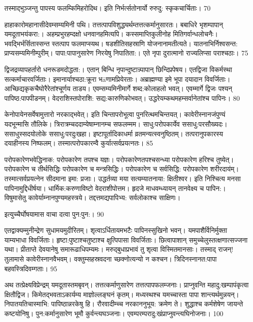 तस्माद्भुञ्जन्तु पापस्य फलम्किमिहरोदिथ।
 इति निर्भर्त्सतोनार्यो रुरुदु: स्कृकचार्चिताः।
 70

  हाहाकारोमहानासीदेवम्सम्यमिनी पथि।
 तत्तत्पापविशुद्ध्यर्थम्तत्तत्कर्मानुसारतः।
 बबाधिरे भृशम्पापान् यमदूताभयंकरा:।
 अहम्प्रभुरहम्दक्षो धनवानहमित्यपि।
 कस्समाप्तिकुलीनोह मितिगर्वान्धलोचनैः।
 भवद्भिर्भर्सितास्सन्त स्तत्पाप फलमाप्स्यथ।
 षडशीतिसहस्राणि योजनानामतीत्यते।
 यातनाभिर्निश्वसन्त: प्राप्यसम्यमिनीम्पुरीम्।
 पापा:पापानुसारेण निरयेषु निपातिता:।
 एते नृपा दुरात्मानो राज्यलिप्सा पराश्चठाः।
 75

  द्विजद्रव्यापहर्तारो धनरूडमदोद्धता:।
 एतान् बिन्धि नृपान्दुष्टान्न्पापान् छिन्दिप्रपेषय।
 एतद्विजा विकर्मस्था सत्कर्माचारवर्जिताः।
 इमानार्याश्चठा:क्रूरा भāणामप्रियेरताः।
 अब्राह्मण्या इमे भूपा दयादान विवर्जिताः।
 आच्छिद्यकृकचैघोरैरेतांश्चूर्णय ताडय।
 एवम्सम्यमिनीमार्गे शब्द:कोलाहलो भवत्।
 एवम्मार्गे द्विजः पश्यन् पापिष्ठ:पापपीडनम्।
 वेदराशिस्तपोराशि: सद्य:कारुणिकोभवत्।
 उद्धरेयम्कथमहम्सर्वानेतांश्च पापिनः।
 80

 

केनोपायेनसर्वेषामुत्तारो नरकाद्भवेत्।
 इति चिन्तापरोभूत्वा पुनरित्थमचिन्तयत्।
 कावेरीस्नानजंपुण्यं यदभून्मासि तौलिके।
 त्रिरात्रम्चददाम्येषाम्नानम्च सफलम्मम।
 साधु:परोपकार्येव ससाधु:परसौख्यदः।
 ससाधुस्सदयोलोके ससाधु:परदुःखहा।
 इष्टापूर्तादिकाधर्मा व्रतमन्यत्स्वनुष्ठितम्।
 तत्परानुपकारस्य दयाहीनस्य निष्फलम्।
 तस्मात्परोपकारम्वै कुर्यात्सर्वप्रयत्नतः।
 85

  परोपकारेणभवेद्धिनाक: परोपकारेण तपश्च यज्ञः।
 परोपकारेणतपश्चसन्ध्या परोपकारेण हरिश्च तुष्येत्।
 परोपकारेण च तीर्थसिद्धिः
परोपकारेण च मन्त्रसिद्धिः।
 परोपकारेण च सर्वसिद्धि:
परोपकारेण शरीरदाय॑म्।
 तस्मात्सर्वप्रयत्नेन सीदमाना इमा: प्रजाः।
 उद्धर्तव्या मया सत्यम्यातनाया: क्षितीश्वर।
 इति निश्चित्य मनसा पापिनामुद्दिधीर्षया।
 धार्मिक:करुणाविष्टो वेदराशीपोत्तम।
 हृदजे माधवम्ध्यायन् तानवेक्ष्य च पापिन:।
 विषुमासेतु कावेर्याम्नानपुण्यमहस्त्रये।
 तद्दत्तमद्यपापिभ्य: सर्वलोकाश्च साक्षिणः।
 

इत्युच्चैर्घोषयामास वाचा दत्वा पुन:पुन:।
 90

  एतद्वाक्यम्मुनीन्द्रेण सुधामयमुदीरितम्।
 शृत्वाऽर्धितायमभटैः पापिनस्सुखिनो भवन्।
 यमपाशैर्विनिर्मुक्ता याम्यभाधा विवर्जिताः।
 हृष्टा:पुष्टाश्चतुष्टाश्च क्षुत्पिपासा विवर्जिताः।
 छित्वापाशान् समुच्चेलुस्तत्क्षणात्सज्जना यथा।
 प्रीताप्ते देवयानेषु समारूढाधिपम्यमः।
 मरुद्बुधाप्रभावं तु शृत्वा विस्मितमानसाः।
 तस्माद् राजन्! तुलामासे कावेरीस्नानवैभवम्।
 वक्तुम्सहस्रवदना च्छक्नोत्यन्यो न कश्चन।
 त्रिदिनस्नानत:पापा बहवस्त्रिदिवम्गताः।
 95

  अथ तत्प्रेक्ष्यविप्रेन्द्रम् यमदूतास्तमबृवन्।
 तत्तत्कर्माणुसारेण तत्तत्पापफलम्जनाः।
 प्राप्नुवन्ति महादु:खम्पापंकृत्वा क्षितौद्विज।
 किमेतद्भवताऽकार्यम्य माज्ञोल्लङ्घनं कृतम्।
 मध्यस्थश्च यमच्चास्ता पापा शान्त्यर्थमुन्नयन्।
 निपातयतिचास्माभि: पापिष्ठान्नरकेषु हि।
 रौरवादीम्च्च नरकाननुभूय: क्रमेण ते।
 शुद्धाश्च कर्मशेषेण जायन्ते कष्टयोनिषु।
 पुन:कर्मानुसारेण भूमौ कुर्वन्त्यघञ्जनाः।
 एवम्परम्परादु:खंप्राप्नुवन्त्यघिनोजनाः।
 100

